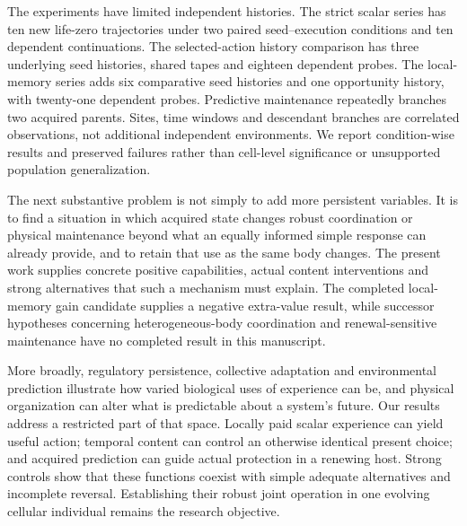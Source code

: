 The experiments have limited independent histories. The strict scalar series has ten new life-zero trajectories under two paired seed--execution conditions and ten dependent continuations. The selected-action history comparison has three underlying seed histories, shared tapes and eighteen dependent probes. The local-memory series adds six comparative seed histories and one opportunity history, with twenty-one dependent probes. Predictive maintenance repeatedly branches two acquired parents. Sites, time windows and descendant branches are correlated observations, not additional independent environments. We report condition-wise results and preserved failures rather than cell-level significance or unsupported population generalization\cite{agarwal2021}.

The next substantive problem is not simply to add more persistent variables. It is to find a situation in which acquired state changes robust coordination or physical maintenance beyond what an equally informed simple response can already provide, and to retain that use as the same body changes. The present work supplies concrete positive capabilities, actual content interventions and strong alternatives that such a mechanism must explain. The completed local-memory gain candidate supplies a negative extra-value result, while successor hypotheses concerning heterogeneous-body coordination and renewal-sensitive maintenance have no completed result in this manuscript.

More broadly, regulatory persistence, collective adaptation and environmental prediction illustrate how varied biological uses of experience can be\cite{acar,yang,lambert,mitchell,tagkopoulos}, and physical organization can alter what is predictable about a system's future\cite{predictability}. Our results address a restricted part of that space. Locally paid scalar experience can yield useful action; temporal content can control an otherwise identical present choice; and acquired prediction can guide actual protection in a renewing host. Strong controls show that these functions coexist with simple adequate alternatives and incomplete reversal. Establishing their robust joint operation in one evolving cellular individual remains the research objective.
